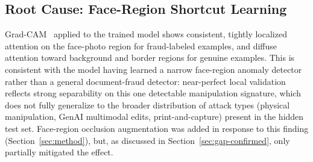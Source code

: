 \documentclass{article}
\begin{document}
\begin{table}[t]
\centering
\caption{Notebook-versioning trail for the diagnostic investigation.}
\label{tab:versioning}
\end{table}

\subsection{Root Cause: Face-Region Shortcut Learning}
\label{sec:shortcut}

Grad-CAM~\cite{selvaraju2017gradcam} applied to the trained model shows
consistent, tightly localized attention on the face-photo region for
fraud-labeled examples, and diffuse attention toward background and border
regions for genuine examples. This is consistent with the model having
learned a narrow face-region anomaly detector rather than a general
document-fraud detector: near-perfect local validation reflects strong
separability on this one detectable manipulation signature, which does not
fully generalize to the broader distribution of attack types (physical
manipulation, GenAI multimodal edits, print-and-capture) present in the
hidden test set. Face-region occlusion augmentation was added in response
to this finding (Section~\ref{sec:method}), but, as discussed in
Section~\ref{sec:gap-confirmed}, only partially mitigated the effect.
\end{document}

